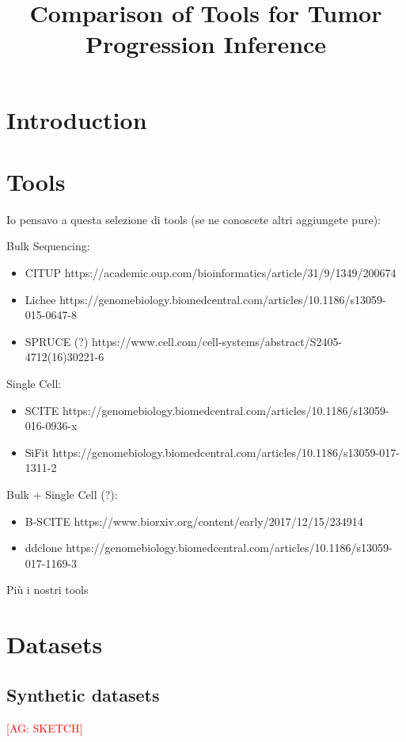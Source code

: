 \documentclass{article}
\title{Comparison of Tools for Tumor Progression Inference}
\author{}
\date{}
\begin{document}
\maketitle

\section{Introduction}

\section{Tools}
Io pensavo a questa selezione di tools (se ne conoscete altri aggiungete pure):

Bulk Sequencing:
\begin{itemize}
\item CITUP https://academic.oup.com/bioinformatics/article/31/9/1349/200674
\item Lichee https://genomebiology.biomedcentral.com/articles/10.1186/s13059-015-0647-8
\item SPRUCE (?) https://www.cell.com/cell-systems/abstract/S2405-4712(16)30221-6
\end{itemize}

Single Cell:
\begin{itemize}
\item SCITE https://genomebiology.biomedcentral.com/articles/10.1186/s13059-016-0936-x
\item SiFit https://genomebiology.biomedcentral.com/articles/10.1186/s13059-017-1311-2
\end{itemize}

Bulk + Single Cell (?):
\begin{itemize}
\item B-SCITE https://www.biorxiv.org/content/early/2017/12/15/234914
\item ddclone https://genomebiology.biomedcentral.com/articles/10.1186/s13059-017-1169-3
\end{itemize}

Più i nostri tools

\section{Datasets}

\subsection{Synthetic datasets}
\textcolor{red}{[AG: SKETCH]}
\end{document}
